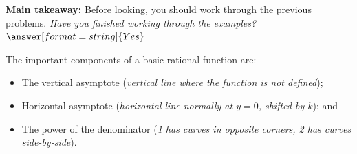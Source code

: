 \documentclass{ximera}
\begin{document}
\begin{question}
\textbf{Main takeaway:} Before looking, you should work through the previous problems. \textit{Have you finished working through the examples?} $\answer[format=string]{Yes}$
\begin{feedback}[correct]
The important components of a basic rational function are:
\begin{itemize}
	\item The vertical asymptote (\textit{vertical line where the function is not defined});
	\item Horizontal asymptote (\textit{horizontal line normally at $y=0$, shifted by $k$}); and
	\item The power of the denominator (\textit{1 has curves in opposite corners, 2 has curves side-by-side}).
\end{itemize}
\end{feedback}
\end{question}
\end{document}
